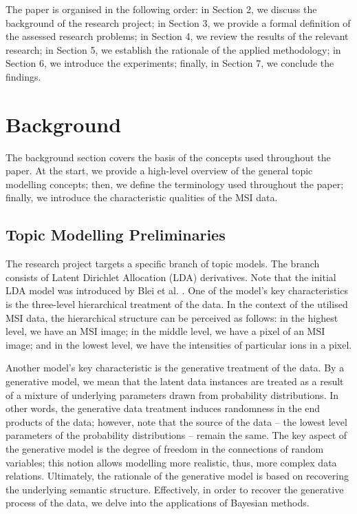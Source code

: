 \documentclass{mpaper}
\begin{document}
\par The paper is organised in the following order: in Section 2, we discuss the background of the research project; in Section 3, we provide a formal definition of the assessed research problems; in Section 4, we review the results of the relevant research; in Section 5, we establish the rationale of the applied methodology; in Section 6, we introduce the experiments; finally, in Section 7, we conclude the findings. 

\section{Background}

\par The background section covers the basis of the concepts used throughout the paper. At the start, we provide a high-level overview of the general topic modelling concepts; then, we define the terminology used throughout the paper; finally, we introduce the characteristic qualities of the MSI data.  
\subsection{Topic Modelling Preliminaries}

\par The research project targets a specific branch of topic models. The branch consists of Latent Dirichlet Allocation (LDA) derivatives. Note that the initial LDA model was introduced by Blei et al. \cite{blei2003latent}. One of the model's key characteristics is the three-level hierarchical treatment of the data. In the context of the utilised MSI data, the hierarchical structure can be perceived as follows: in the highest level, we have an MSI image; in the middle level, we have a pixel of an MSI image; and in the lowest level, we have the intensities of particular ions in a pixel.

\par Another model's key characteristic is the generative treatment of the data. By a generative model, we mean that the latent data instances are treated as a result of a mixture of underlying parameters drawn from probability distributions. In other words, the generative data treatment induces randomness in the end products of the data; however, note that the source of the data -- the lowest level parameters of the probability distributions -- remain the same. The key aspect of the generative model is the degree of freedom in the connections of random variables; this notion allows modelling more realistic, thus, more complex data relations. Ultimately, the rationale of the generative model is based on recovering the underlying semantic structure. Effectively, in order to recover the generative process of the data, we delve into the applications of Bayesian methods.
\end{document}
